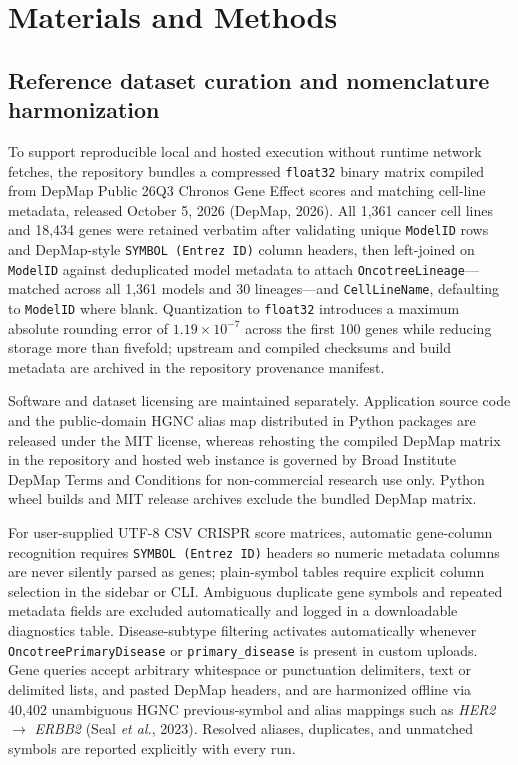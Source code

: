 \documentclass[11pt,a4paper]{article}
\begin{document}
\section{Materials and Methods}

\subsection{Reference dataset curation and nomenclature harmonization}
To support reproducible local and hosted execution without runtime network fetches, the repository bundles a compressed \texttt{float32} binary matrix compiled from DepMap Public 26Q3 Chronos Gene Effect scores and matching cell-line metadata, released October 5, 2026 (DepMap, 2026). All 1,361 cancer cell lines and 18,434 genes were retained verbatim after validating unique \texttt{ModelID} rows and DepMap-style \texttt{SYMBOL (Entrez ID)} column headers, then left-joined on \texttt{ModelID} against deduplicated model metadata to attach \texttt{OncotreeLineage}---matched across all 1,361 models and 30 lineages---and \texttt{CellLineName}, defaulting to \texttt{ModelID} where blank. Quantization to \texttt{float32} introduces a maximum absolute rounding error of $1.19 \times 10^{-7}$ across the first 100 genes while reducing storage more than fivefold; upstream and compiled checksums and build metadata are archived in the repository provenance manifest.

Software and dataset licensing are maintained separately. Application source code and the public-domain HGNC alias map distributed in Python packages are released under the MIT license, whereas rehosting the compiled DepMap matrix in the repository and hosted web instance is governed by Broad Institute DepMap Terms and Conditions for non-commercial research use only. Python wheel builds and MIT release archives exclude the bundled DepMap matrix.

For user-supplied UTF-8 CSV CRISPR score matrices, automatic gene-column recognition requires \texttt{SYMBOL (Entrez ID)} headers so numeric metadata columns are never silently parsed as genes; plain-symbol tables require explicit column selection in the sidebar or CLI. Ambiguous duplicate gene symbols and repeated metadata fields are excluded automatically and logged in a downloadable diagnostics table. Disease-subtype filtering activates automatically whenever \texttt{OncotreePrimaryDisease} or \texttt{primary\_disease} is present in custom uploads. Gene queries accept arbitrary whitespace or punctuation delimiters, text or delimited lists, and pasted DepMap headers, and are harmonized offline via 40,402 unambiguous HGNC previous-symbol and alias mappings such as \textit{HER2} $\rightarrow$ \textit{ERBB2} (Seal \textit{et al.}, 2023). Resolved aliases, duplicates, and unmatched symbols are reported explicitly with every run.
\end{document}
